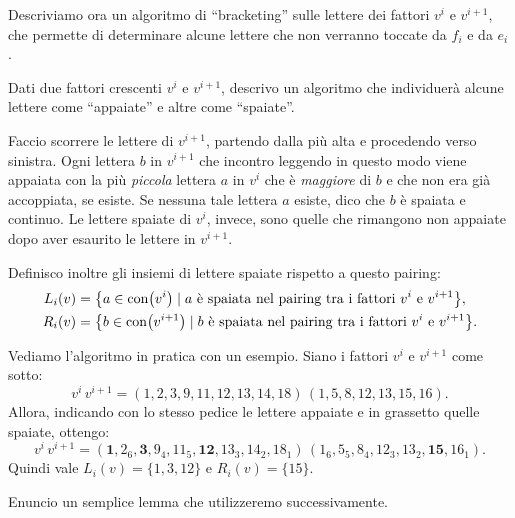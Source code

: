 Descriviamo ora un algoritmo di ``bracketing''
sulle lettere dei fattori $v^i$ e $v^{i+1}$, che permette di determinare
alcune lettere che non verranno toccate da $f_i$ e da $e_i$.

\begin{definition}[$i$-pairing]
    \label{def:ms_i_pairing}
    Dati due fattori crescenti $v^i$ e $v^{i+1}$, descrivo un algoritmo che 
    individuer\`a alcune lettere come ``appaiate'' e altre come ``spaiate''.

    Faccio scorrere le lettere di $v^{i+1}$, partendo dalla pi\`u alta e procedendo verso
    sinistra.
    Ogni lettera $b$ in $v^{i+1}$ che incontro leggendo in questo modo
    viene appaiata con la pi\`u \emph{piccola} lettera $a$ in $v^{i}$ che \`e 
    \emph{maggiore} di $b$ e che non era gi\`a accoppiata, se esiste.
    Se nessuna tale lettera $a$ esiste, dico che $b$ \`e spaiata e continuo.
    Le lettere spaiate di $v^i$, invece, sono quelle che rimangono non appaiate dopo
    aver esaurito le lettere in $v^{i+1}$.

    Definisco inoltre gli insiemi di lettere spaiate rispetto a questo pairing:
    \begin{align*}
        L_i(v) &= \bigl\{ a \in \operatorname{con}\bigl(v^i\bigr) \mid \text{$a$ \`e spaiata
        nel pairing tra i fattori $v^i$ e $v^{i+1}$} \bigr\},
        \\
        R_i(v) &= \bigl\{ b \in \operatorname{con}\bigl(v^{i+1}\bigr) \mid \text{$b$ \`e spaiata
        nel pairing tra i fattori $v^i$ e $v^{i+1}$} \bigr\}.
    \end{align*}
\end{definition}

\begin{example}
    \label{ex:accoppiamento}
    Vediamo l'algoritmo in pratica 
    con un esempio. Siano i fattori $v^i$ e  $v^{i+1}$ come sotto:
    \[
        v^i \, v^{i+1} = 
        ( 1, 2, 3, 9, 11, 12, 13, 14, 18 ) \,
        ( 1, 5, 8, 12, 13, 15, 16).
    \]
    Allora,  indicando con lo stesso pedice le lettere appaiate 
    e in grassetto quelle spaiate, ottengo:
    \[
        v^i \, v^{i+1} = 
        ( \mathbf{1}, 2_6, \mathbf{3}, 9_4, 11_5, \mathbf{12}, 13_3, 14_2, 18_1 ) \,
        ( 1_6, 5_5, 8_4, 12_3, 13_2, \mathbf{15}, 16_1).
    \]
    Quindi vale $L_i(v) = \{ 1, 3, 12 \}$ e $R_i(v) = \{ 15 \}$.
\end{example}

Enuncio un semplice lemma che utilizzeremo successivamente.


